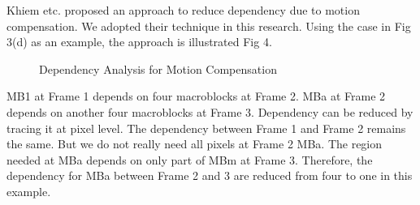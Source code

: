 Khiem etc. proposed an approach to reduce dependency due to motion compensation\cite{Ngo:2011:AEZ:1943552.1943581}. We adopted their technique in this research. Using the case in Fig 3(d) as an example, the approach is illustrated Fig 4.

\begin{figure}
\centering
\quad\quad
{}
\caption{Dependency Analysis for Motion Compensation}
\end{figure}

MB1 at Frame 1 depends on four macroblocks at Frame 2. MBa at Frame 2 depends on another four macroblocks at Frame 3. Dependency can be reduced by tracing it at pixel level. The dependency between Frame 1 and Frame 2 remains the same. But we do not really need all pixels at Frame 2 MBa. The region needed at MBa depends on only part of MBm at Frame 3. Therefore, the dependency for MBa between Frame 2 and 3 are reduced from four to one in this example.

